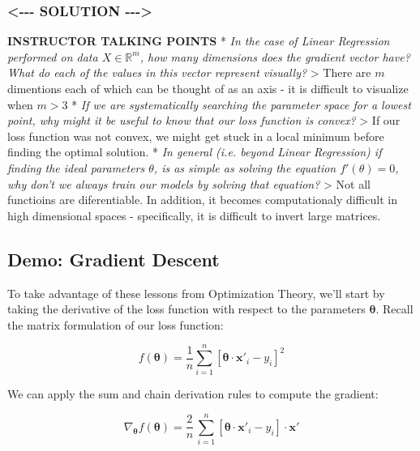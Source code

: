 \documentclass[11pt]{article}
\begin{document}
    \subsubsection{\textless{}-\/-\/- SOLUTION
-\/-\/-\textgreater{}}\label{solution----}

\textbf{INSTRUCTOR TALKING POINTS} * \emph{In the case of Linear
Regression performed on data \(X \in \mathbb{R}^m\), how many dimensions
does the gradient vector have? What do each of the values in this vector
represent visually?} \textgreater{} There are \(m\) dimentions each of
which can be thought of as an axis - it is difficult to visualize when
\(m > 3\) * \emph{If we are systematically searching the parameter space
for a lowest point, why might it be useful to know that our loss
function is convex?} \textgreater{} If our loss function was not convex,
we might get stuck in a local minimum before finding the optimal
solution. * \emph{In general (i.e. beyond Linear Regression) if finding
the ideal parameters \(\theta\), is as simple as solving the equation
\(f'(\theta)=0\), why don't we always train our models by solving that
equation?} \textgreater{} Not all functioins are diferentiable. In
addition, it becomes computationaly difficult in high dimensional spaces
- specifically, it is difficult to invert large matrices.

    \subsection{Demo: Gradient Descent}\label{demo-gradient-descent}

    To take advantage of these lessons from Optimization Theory, we'll start
by taking the derivative of the loss function with respect to the
parameters \(\boldsymbol{\theta}\). Recall the matrix formulation of our
loss function:

\begin{equation}\tag{1.3}
f(\boldsymbol{\theta}) = \frac{1}{n}\sum_{i=1}^{n}\left[ \boldsymbol{\theta}\cdot\mathbf{x}'_i - y_i\right]^2
\end{equation}

We can apply the sum and chain derivation rules to compute the gradient:

\begin{equation}\tag{3.1}
\nabla_{\boldsymbol{\theta}} f(\boldsymbol{\theta}) = \frac{2}{n}\,\sum_{i=1}^{n}\left[ \boldsymbol{\theta}\cdot\mathbf{x}'_i - y_i\right] \cdot \mathbf{x}'
\end{equation}
\end{document}
